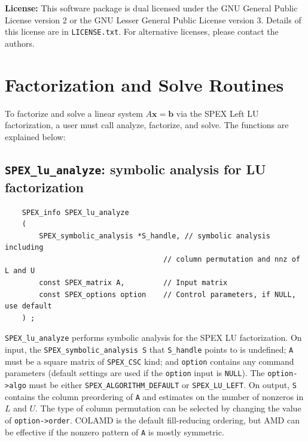\documentclass[12pt,oneside]{book}
\theoremstyle{definition}
\begin{document}
\noindent \textbf{License:} This software package is dual licensed under the GNU General Public License version 2 or the GNU Lesser General Public License version 3. Details of this license are in \verb|LICENSE.txt|. For alternative licenses, please contact the authors.


\section{Factorization and Solve Routines}

To factorize and solve a linear system $A \mathbf{x} = \mathbf{b}$ via the SPEX Left LU factorization, a user must call analyze, factorize, and solve. The functions are explained below:

\subsection{\texttt{SPEX\_lu\_analyze}: symbolic analysis for LU factorization} \label{ss:spex_lu_analyze}
\begin{mdframed}[userdefinedwidth=\textwidth]
{\footnotesize
\begin{verbatim}
    SPEX_info SPEX_lu_analyze
    (
        SPEX_symbolic_analysis *S_handle, // symbolic analysis including
                                     // column permutation and nnz of L and U
        const SPEX_matrix A,         // Input matrix
        const SPEX_options option    // Control parameters, if NULL, use default
    ) ;
\end{verbatim}
} \end{mdframed}

\verb|SPEX_lu_analyze| performs symbolic analysis for the SPEX LU factorization. On input, the \verb|SPEX_symbolic_analysis S| that \verb|S_handle| points to is undefined; \verb|A| must be a square matrix of \verb|SPEX_CSC| kind; and \verb|option| contains any command parameters  (default settings are used if the \verb|option| input is \verb|NULL|). The \verb|option->algo| must be either \verb|SPEX_ALGORITHM_DEFAULT| or \verb|SPEX_LU_LEFT|. On output, \verb|S| contains the column preordering of \verb|A| and estimates on the number of nonzeros in $L$ and $U$. The type of column permutation can be selected by changing the value of \verb|option->order|.  COLAMD is the default fill-reducing ordering, but AMD can be effective if the nonzero
pattern of \verb'A' is mostly symmetric.
\end{document}
